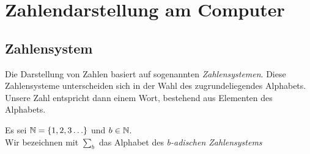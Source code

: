 \section{Zahlendarstellung am Computer}
\subsection{Zahlensystem}
Die Darstellung von Zahlen basiert auf sogenannten \emph{Zahlensystemen}.
Diese Zahlensysteme unterscheiden sich in der Wahl des zugrundeliegendes Alphabets.
Unsere Zahl entspricht dann einem Wort, bestehend aus Elementen des Alphabets.\\


\begin{definition}[Alphabet]
Es sei $\mathbb{N} = \{ 1,2,3\ldots \}$ und $b \in  \mathbb{N}$. \\
Wir bezeichnen mit $\sum_{b}$ das Alphabet des \emph{b-adischen Zahlensystems}
\end{definition}

